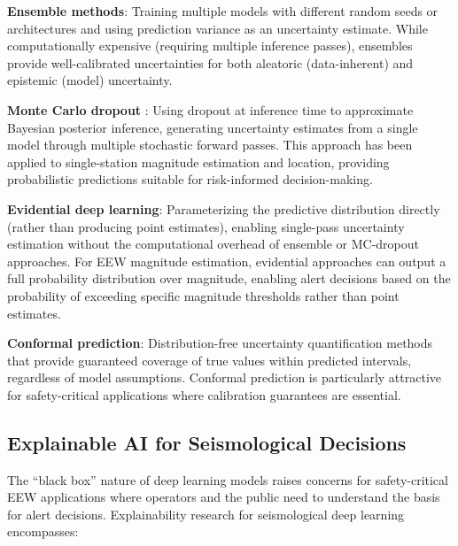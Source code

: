 \documentclass[review,authoryear]{elsarticle}
\begin{document}
\textbf{Ensemble methods}: Training multiple models with different random seeds or architectures and using prediction variance as an uncertainty estimate. While computationally expensive (requiring multiple inference passes), ensembles provide well-calibrated uncertainties for both aleatoric (data-inherent) and epistemic (model) uncertainty.

\textbf{Monte Carlo dropout} \citep{gal2016dropout}: Using dropout at inference time to approximate Bayesian posterior inference, generating uncertainty estimates from a single model through multiple stochastic forward passes. This approach has been applied to single-station magnitude estimation \citep{mousavi2019bayesian} and location, providing probabilistic predictions suitable for risk-informed decision-making.

\textbf{Evidential deep learning}: Parameterizing the predictive distribution directly (rather than producing point estimates), enabling single-pass uncertainty estimation without the computational overhead of ensemble or MC-dropout approaches. For EEW magnitude estimation, evidential approaches can output a full probability distribution over magnitude, enabling alert decisions based on the probability of exceeding specific magnitude thresholds rather than point estimates.

\textbf{Conformal prediction}: Distribution-free uncertainty quantification methods that provide guaranteed coverage of true values within predicted intervals, regardless of model assumptions. Conformal prediction is particularly attractive for safety-critical applications where calibration guarantees are essential.

\subsection{Explainable AI for Seismological Decisions}

The ``black box'' nature of deep learning models raises concerns for safety-critical EEW applications where operators and the public need to understand the basis for alert decisions. Explainability research for seismological deep learning encompasses:
\end{document}
